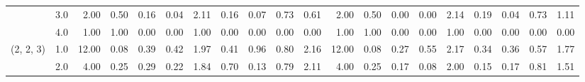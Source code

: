 \begin{tabular}{llrrrrrrrrrrrrrrrrrr}
          & 3.0 &               2.00 &                     0.50 &                                 0.16 &                             0.04 &                           2.11 &                                               0.16 &                                            0.07 &                                            0.73 &                                        0.61 &               2.00 &                     0.50 &                                 0.00 &                             0.00 &                           2.14 &                                               0.19 &                                            0.04 &                                            0.73 &                                        1.11 \\
          & 4.0 &               1.00 &                     1.00 &                                 0.00 &                             0.00 &                           1.00 &                                               0.00 &                                            0.00 &                                            0.00 &                                        0.00 &               1.00 &                     1.00 &                                 0.00 &                             0.00 &                           1.00 &                                               0.00 &                                            0.00 &                                            0.00 &                                        0.00 \\
(2, 2, 3) & 1.0 &              12.00 &                     0.08 &                                 0.39 &                             0.42 &                           1.97 &                                               0.41 &                                            0.96 &                                            0.80 &                                        2.16 &              12.00 &                     0.08 &                                 0.27 &                             0.55 &                           2.17 &                                               0.34 &                                            0.36 &                                            0.57 &                                        1.77 \\
          & 2.0 &               4.00 &                     0.25 &                                 0.29 &                             0.22 &                           1.84 &                                               0.70 &                                            0.13 &                                            0.79 &                                        2.11 &               4.00 &                     0.25 &                                 0.17 &                             0.08 &                           2.00 &                                               0.15 &                                            0.17 &                                            0.81 &                                        1.51 \\

\end{tabular}
